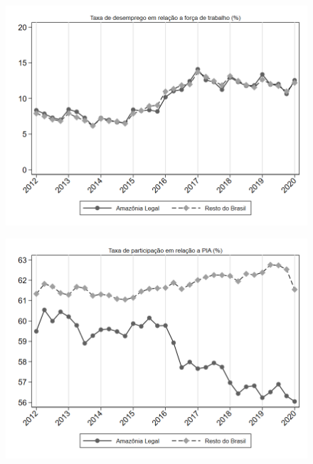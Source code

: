 \begin{frame}[label=_estrutura_emprego_taxa_de_desemprego]{}
\textit{\hyperlink{_estrutura_emprego}{}}
\begin{figure}
  \centering
  \includegraphics[width=1.0\linewidth]{../../analysis/output/estrutura_emprego/_estrutura_emprego_taxa_de_desemprego.png}
  \caption{}
  \label{fig:_estrutura_emprego_taxa_de_desemprego}
\end{figure}
\end{frame}

\begin{frame}[label=_estrutura_emprego_taxa_de_participacao]{}
\textit{\hyperlink{_estrutura_emprego}{}}
\begin{figure}
  \centering
  \includegraphics[width=1.0\linewidth]{../../analysis/output/estrutura_emprego/_estrutura_emprego_taxa_de_participacao.png}
  \caption{}
  \label{fig:_estrutura_emprego_taxa_de_participacao}
\end{figure}
\end{frame}


